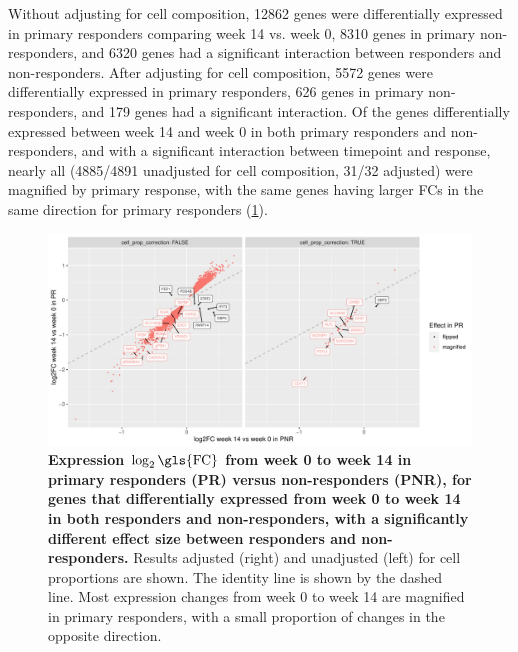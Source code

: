 Without adjusting for cell composition,
\num{12862} genes were differentially expressed in primary responders comparing week 14 vs. week 0,
\num{8310} genes in primary non-responders,
and \num{6320} genes had a significant interaction between responders and non-responders.
After adjusting for cell composition, 
\num{5572} genes were differentially expressed in primary responders,
\num{626} genes in primary non-responders,
and \num{179} genes had a significant interaction.
Of the genes differentially expressed between week 14 and week 0 in both primary responders and non-responders,
and with a significant interaction between timepoint and response, 
nearly all (\num{4885/4891} unadjusted for cell composition, \num{31/32} adjusted) were magnified by primary response,
with the same genes having larger \glspl{FC} in the same direction for primary responders (\cref{fig:multipants_dge_logFC_C_3R_1R_vs_logFC_C_3N_1N}).

\begin{figure}
    \centering
    \includegraphics[width=1.0\textwidth,page=1]{mainmatter/figures/chapter_04/plot_gene_set_enrichment.logFC_C_3R_1R_vs_logFC_C_3N_1N.pdf}
    \caption{
        \textbf{Expression $\log_2\text{\gls{FC}}$ from week 0 to week 14 in primary responders (PR) versus non-responders (PNR),
        for genes that differentially expressed from week 0 to week 14 in both responders and non-responders, 
        with a significantly different effect size between responders and non-responders.
        }
        Results adjusted (right) and unadjusted (left) for cell proportions are shown.
        The identity line is shown by the dashed line.
        Most expression changes from week 0 to week 14 are magnified in primary responders, with a small proportion of changes in the opposite direction.
    }
    \label{fig:multipants_dge_logFC_C_3R_1R_vs_logFC_C_3N_1N}
\end{figure}

